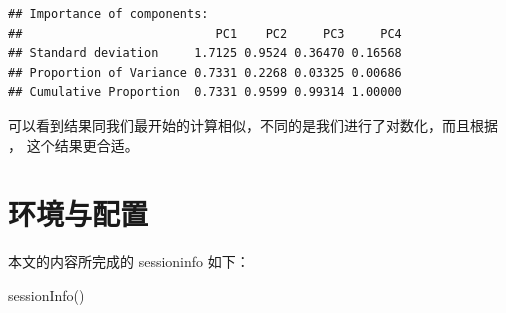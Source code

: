 \documentclass[
]{krantz}
\makeatletter
\newenvironment{Shaded}{\begin{snugshade}}{\end{snugshade}}
\newcommand{\FunctionTok}[1]{\textcolor[rgb]{0.00,0.00,0.00}{#1}}
\newcommand{\NormalTok}[1]{#1}
\newenvironment{kframe}{%
\medskip{}
\setlength{\fboxsep}{.8em}
 \def\at@end@of@kframe{}%
 \ifinner\ifhmode%
  \def\at@end@of@kframe{\end{minipage}}%
  \begin{minipage}{\columnwidth}%
 \fi\fi%
 \def\FrameCommand##1{\hskip\@totalleftmargin \hskip-\fboxsep
 \colorbox{shadecolor}{##1}\hskip-\fboxsep
     \hskip-\linewidth \hskip-\@totalleftmargin \hskip\columnwidth}%
 \MakeFramed {\advance\hsize-\width
   \@totalleftmargin\z@ \linewidth\hsize
   \@setminipage}}%
 {\par\unskip\endMakeFramed%
 \at@end@of@kframe}
\renewenvironment{Shaded}{\begin{kframe}}{\end{kframe}}
\makeatother
\begin{document}
\begin{verbatim}
## Importance of components:
##                           PC1    PC2     PC3     PC4
## Standard deviation     1.7125 0.9524 0.36470 0.16568
## Proportion of Variance 0.7331 0.2268 0.03325 0.00686
## Cumulative Proportion  0.7331 0.9599 0.99314 1.00000
\end{verbatim}

可以看到结果同我们最开始的计算相似，不同的是我们进行了对数化，而且根据 \citet{kemp2003modern}， 这个结果更合适。

\hypertarget{sessioninfo}{%
\chapter{环境与配置}\label{sessioninfo}}

本文的内容所完成的 sessioninfo 如下：

\begin{Shaded}
\begin{Highlighting}[]
\FunctionTok{sessionInfo}\NormalTok{()}
\end{Highlighting}
\end{Shaded}
\end{document}
